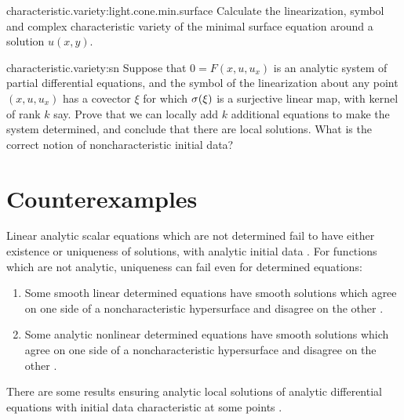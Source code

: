 \begin{problem}{characteristic.variety:light.cone.min.surface}
Calculate the linearization, symbol and complex characteristic variety of the minimal surface equation around a solution \(u(x,y)\).
\end{problem}
\begin{problem}{characteristic.variety:sn}
Suppose that \(0=F(x,u,u_x)\) is an analytic system of partial differential equations, and the symbol of the linearization about any point \((x,u,u_x)\) has a covector \(\xi\) for which \(\opsymbol[]{\xi}\) is a surjective linear map, with kernel of rank \(k\) say.
Prove that we can locally add \(k\) additional equations to make the system determined, and conclude that there are local solutions.
What is the correct notion of noncharacteristic initial data?
\end{problem}
\section{Counterexamples}
Linear analytic scalar equations which are not determined fail to have either existence or uniqueness of solutions, with analytic initial data \cite{Kitagawa:1990}. 
For functions which are not analytic,  uniqueness can fail even for determined equations:
\begin{enumerate}
\item
Some smooth linear determined equations have smooth solutions which agree on one side of a noncharacteristic hypersurface and disagree on the other \cite{Alinhac/Baouendi:1995}.
\item
Some analytic nonlinear determined equations have smooth solutions which agree on one side of a noncharacteristic hypersurface and disagree on the other \cite{Metivier:1993}.
\end{enumerate}
There are some results ensuring analytic local solutions of analytic differential equations with initial data characteristic at some points \cite{enciso2020ramified}.